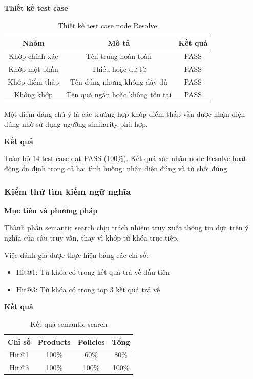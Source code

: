 \textbf{Thiết kế test case}

\begin{table}[h]
\centering
\small
\begin{tabular}{|c|c|c|}
\hline
Nhóm & Mô tả & Kết quả \\
\hline
Khớp chính xác & Tên trùng hoàn toàn & PASS \\
Khớp một phần & Thiếu hoặc dư từ & PASS \\
Khớp điểm thấp & Tên đúng nhưng không đầy đủ & PASS \\
Không khớp & Tên quá ngắn hoặc không tồn tại & PASS \\
\hline
\end{tabular}
\caption{Thiết kế test case node Resolve}
\end{table}

Một điểm đáng chú ý là các trường hợp khớp điểm thấp vẫn được nhận diện đúng nhờ sử dụng ngưỡng similarity phù hợp.

\textbf{Kết quả}

Toàn bộ 14 test case đạt PASS (100\%). Kết quả xác nhận node Resolve hoạt động ổn định trong cả hai tình huống: nhận diện đúng và từ chối đúng.

\subsubsection{Kiểm thử tìm kiếm ngữ nghĩa}

\textbf{Mục tiêu và phương pháp}

Thành phần semantic search chịu trách nhiệm truy xuất thông tin dựa trên ý nghĩa của câu truy vấn, thay vì khớp từ khóa trực tiếp.

Việc đánh giá được thực hiện bằng các chỉ số:

\begin{itemize}
\item Hit@1: Từ khóa có trong kết quả trả về đầu tiên
\item Hit@3: Từ khóa có trong top 3 kết quả trả về
\end{itemize}

\textbf{Kết quả}

\begin{table}[h]
\centering
\small
\begin{tabular}{|c|c|c|c|}
\hline
Chỉ số & Products & Policies & Tổng \\
\hline
Hit@1 & 100\% & 60\% & 80\% \\
Hit@3 & 100\% & 100\% & 100\% \\
\hline
\end{tabular}
\caption{Kết quả semantic search}
\end{table}

